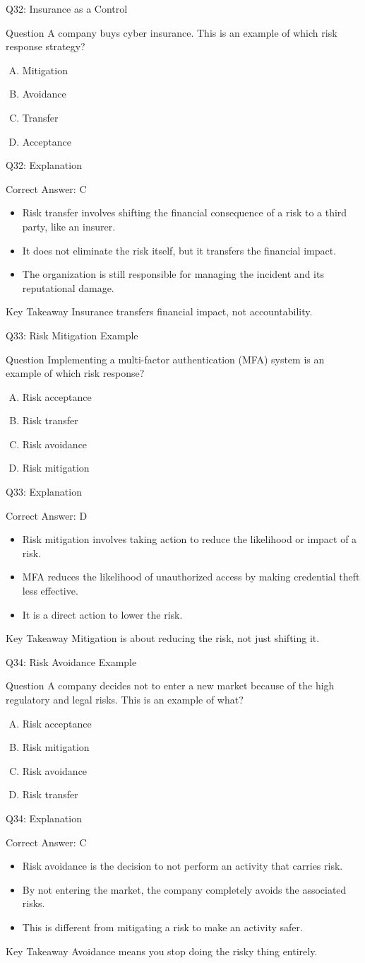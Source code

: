 \documentclass[aspectratio=169]{beamer}
\newcommand{\hq}[7]{%
	\begin{frame}{Q#1: #2}
		\begin{block}{Question}
			#3
		\end{block}
		\begin{enumerate}[(A)]
			#4
		\end{enumerate}
	\end{frame}
	\begin{frame}{Q#1: Explanation}
		\begin{block}{Correct Answer: #5}
			\begin{itemize}
				#6
			\end{itemize}
		\end{block}
		\begin{alertblock}{Key Takeaway}
			#7
		\end{alertblock}
	\end{frame}
}
\begin{document}
	\hq{32}{Insurance as a Control}
	{A company buys cyber insurance. This is an example of which risk response strategy?}
	{\item Mitigation
		\item Avoidance
		\item Transfer
		\item Acceptance}
	{C}
	{\item Risk transfer involves shifting the financial consequence of a risk to a third party, like an insurer.
		\item It does not eliminate the risk itself, but it transfers the financial impact.
		\item The organization is still responsible for managing the incident and its reputational damage.}
	{Insurance transfers financial impact, not accountability.}
	
	\hq{33}{Risk Mitigation Example}
	{Implementing a multi-factor authentication (MFA) system is an example of which risk response?}
	{\item Risk acceptance
		\item Risk transfer
		\item Risk avoidance
		\item Risk mitigation}
	{D}
	{\item Risk mitigation involves taking action to reduce the likelihood or impact of a risk.
		\item MFA reduces the likelihood of unauthorized access by making credential theft less effective.
		\item It is a direct action to lower the risk.}
	{Mitigation is about reducing the risk, not just shifting it.}
	
	\hq{34}{Risk Avoidance Example}
	{A company decides not to enter a new market because of the high regulatory and legal risks. This is an example of what?}
	{\item Risk acceptance
		\item Risk mitigation
		\item Risk avoidance
		\item Risk transfer}
	{C}
	{\item Risk avoidance is the decision to not perform an activity that carries risk.
		\item By not entering the market, the company completely avoids the associated risks.
		\item This is different from mitigating a risk to make an activity safer.}
	{Avoidance means you stop doing the risky thing entirely.}
	
\end{document}
